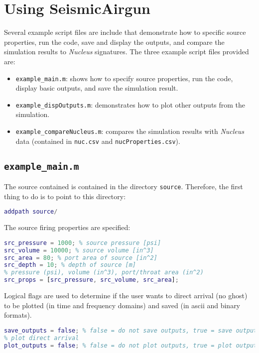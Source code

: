 \documentclass[10pt]{article}
\begin{document}
\newpage
\section{Using {\bf SeismicAirgun}}
Several example script files are include that demonstrate how to specific source properties, run the code, save and display the outputs, and compare the simulation results to \emph{Nucleus} signatures. The three example script files provided are:
\begin{itemize}
\item \texttt{example\_main.m}: shows how to specify source properties, run the code, display basic outputs, and save the simulation result.
\item \texttt{example\_dispOutputs.m}: demonstrates how to plot other outputs from the simulation.
\item \texttt{example\_compareNucleus.m}: compares the simulation results with \emph{Nucleus} data (contained in \texttt{nuc.csv} and \texttt{nucProperties.csv}).
\end{itemize}

\subsection{\texttt{example\_main.m}}
The source contained is contained in the directory \texttt{source}. Therefore, the first thing to do is to point to this directory:
\begin{lstlisting}[language=Matlab]
addpath source/
\end{lstlisting}

The source firing properties are specified:
\begin{lstlisting}[language=Matlab]
% Source Firing Configuration
src_pressure = 1000; % source pressure [psi]
src_volume = 10000; % source volume [in^3]
src_area = 80; % port area of source [in^2]
src_depth = 10; % depth of source [m]
% pressure (psi), volume (in^3), port/throat area (in^2)
src_props = [src_pressure, src_volume, src_area]; 
\end{lstlisting}

Logical flags are used to determine if the user wants to direct arrival (no ghost) to be plotted (in time and frequency domains) and saved (in ascii and binary formats).
\begin{lstlisting}[language=Matlab]
% save direct arrival
save_outputs = false; % false = do not save outputs, true = save outputs
% plot direct arrival 
plot_outputs = false; % false = do not plot outputs, true = plot outputs
\end{lstlisting}
\end{document}
